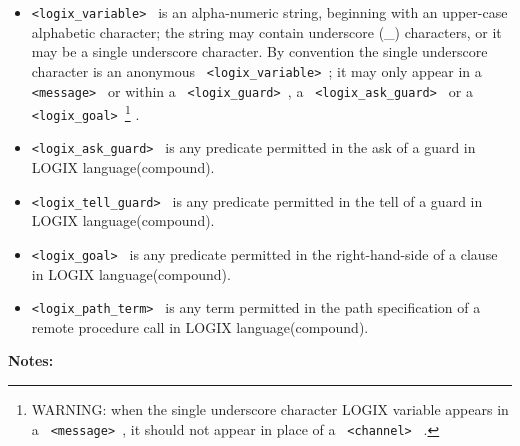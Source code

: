 \begin{itemize}
\item
\verb+<logix_variable> + is an alpha-numeric string, beginning with an
upper-case alphabetic character; the string may contain underscore
(\_) characters, or it may be a single underscore character.  By
convention the single underscore character is an anonymous
\verb+ <logix_variable> +; it may only appear in a \verb+ <message> + or
within a \verb+ <logix_guard> +, a \verb+ <logix_ask_guard> + or a
\verb+ <logix_goal> +\footnote{WARNING: when the single underscore
character LOGIX variable appears in a \verb+ <message> +, it
should not appear in place of a \verb+ <channel> + . } .

\item
\verb+<logix_ask_guard> + is any predicate permitted in the ask of a
guard in LOGIX language(compound).

\item
\verb+<logix_tell_guard> + is any predicate permitted in the tell of a
guard in LOGIX language(compound).

\item
\verb+<logix_goal> + is any predicate permitted in the right-hand-side
of a clause in LOGIX language(compound).

\item
\verb+<logix_path_term> + is any term permitted in the path
specification of a remote procedure call in LOGIX language(compound).
\end{itemize}

\newpage

\noindent
{\bf\Large Notes:}

